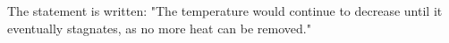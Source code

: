 The statement is written:  
"The temperature would continue to decrease until it eventually stagnates, as no more heat can be removed."